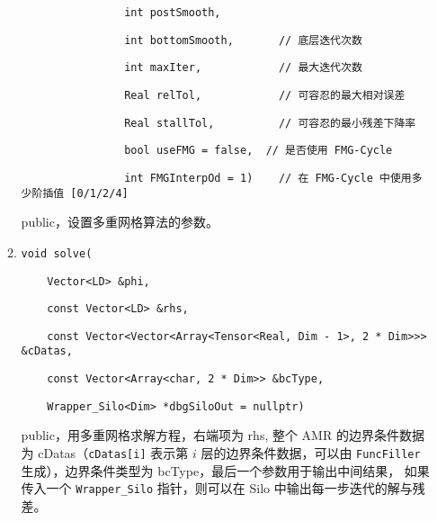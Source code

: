 \documentclass[cn, bibend=bibtex]{elegantpaper}
\theoremstyle{plain}
\begin{document}
\begin{itemize}
\begin{enumerate}
          \lstinline|                int postSmooth,|
          
          \lstinline|                int bottomSmooth,       // 底层迭代次数|
          
          \lstinline|                int maxIter,            // 最大迭代次数|
          
          \lstinline|                Real relTol,            // 可容忍的最大相对误差|
          
          \lstinline|                Real stallTol,          // 可容忍的最小残差下降率|
          
          \lstinline|                bool useFMG = false,  // 是否使用 FMG-Cycle|
          
          \lstinline|                int FMGInterpOd = 1)    // 在 FMG-Cycle 中使用多少阶插值 [0/1/2/4]|

    public，设置多重网格算法的参数。

    \item \lstinline|void solve(|
      
      \lstinline|    Vector<LD> &phi,|
      
      \lstinline|    const Vector<LD> &rhs,|
      
      \lstinline|    const Vector<Vector<Array<Tensor<Real, Dim - 1>, 2 * Dim>>> &cDatas,|
      
      \lstinline|    const Vector<Array<char, 2 * Dim>> &bcType,|
      
      \lstinline|    Wrapper_Silo<Dim> *dbgSiloOut = nullptr)|

    public，用多重网格求解方程，右端项为 rhs, 整个 AMR 的边界条件数据为 cDatas（\lstinline|cDatas[i]| 表示第 $i$ 层的边界条件数据，可以由 \lstinline|FuncFiller| 生成），边界条件类型为 bcType，最后一个参数用于输出中间结果，
    如果传入一个 \lstinline|Wrapper_Silo| 指针，则可以在 Silo 中输出每一步迭代的解与残差。
  \end{enumerate}
\end{itemize}
\end{document}
